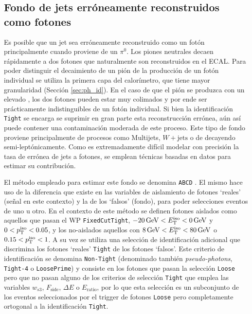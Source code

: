 \subsection{Fondo de jets erróneamente reconstruidos como fotones}\label{sec:jfakes}

Es posible que un jet sea erróneamente reconstruido como un fotón principalmente cuando proviene de un $\pi^0$. Los piones neutrales decaen rápidamente a dos fotones que naturalmente son reconstruidos en el ECAL. Para poder distinguir el decaimiento de un pión de la producción de un fotón individual se utiliza la primera capa del calorímetro, que tiene mayor granularidad (Sección \ref{sec:ph_id}). En el caso de que el pión se produzca con un elevado \pt, los dos fotones pueden estar muy colimados y por ende ser prácticamente indistinguibles de un fotón individual. Si bien la identificación \texttt{Tight} se encarga se suprimir en gran parte esta reconstrucción errónea, aún así puede contener una contaminación moderada de este proceso. Este tipo de fondo proviene principalmente de procesos como Multijets, $W+\text{jets}$ o de \ttbar decayendo semi-leptónicamente. 
Como es extremadamente difícil modelar con precisión la tasa de errónea de jets a fotones, se emplean técnicas basadas en datos para estimar su contribución.


El método empleado para estimar este fondo se denomina \texttt{ABCD} \cite{Alonso:2233238}. El mismo hace uso de la diferencia que existe en las variables de aislamiento de fotones `reales' (señal en este contexto) y la de los `falsos' (fondo), para poder selecciones eventos de uno u otro.
En el contexto de este método se definen fotones aislados como aquellos que pasan el WP \texttt{FixedCutTight},
 $-20\,\text{GeV}<E_{\text{T}}^{\text{iso}}<0\,\text{GeV}$ y $0<p_{\text{T}}^{\text{iso}}<0.05$, y los no-aislados aquellos con $8\,\text{GeV}<E_{\text{T}}^{\text{iso}}<80\,\text{GeV}$ o $0.15<p_{\text{T}}^{\text{iso}}<1$.
A su vez se utiliza una selección de identificación adicional que discrimina los fotones `reales' \texttt{Tight} de los fotones `falsos'. Este criterio de identificación se denomina \texttt{Non-Tight} (denominado también \textit{pseudo-photons}, \texttt{Tight-4} o \texttt{LoosePrime}) y consiste en los fotones que pasan la selección \texttt{Loose} pero que no pasan alguno de los criterios de selección \texttt{Tight} que emplea las variables $w_{s3}$, $F_{\text{side}}$, $\Delta E$ o $E_{\text{ratio}}$, por lo que esta selección es un subconjunto de los eventos seleccionados por el trigger de fotones \texttt{Loose} pero completamente ortogonal a la identificación \texttt{Tight}. 

